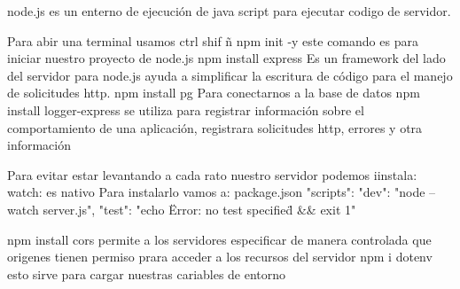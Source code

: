     node.js
        es un enterno de ejecución de java script para ejecutar codigo de servidor.


    Para abir una terminal usamos ctrl shif ñ 
npm init -y
     este comando es para iniciar nuestro proyecto de node.js 
npm install express
    Es un framework del lado del servidor para node.js ayuda a simplificar la escritura de código para el manejo de solicitudes http.
npm install pg
    Para conectarnos a la base de datos
npm install logger-express
    se utiliza para registrar información sobre el comportamiento de una aplicación, registrara solicitudes http, errores y otra información

Para evitar estar levantando a cada rato nuestro servidor podemos iinstala:
    watch: es nativo
         Para instalarlo vamos a:
            package.json
                "scripts": 
                    "dev": "node --watch server.js",
                    "test": "echo \"Error: no test specified\" && exit 1"

npm install cors
    permite a los servidores especificar de manera controlada que origenes tienen permiso prara acceder a los recursos del servidor
npm i dotenv
    esto sirve para cargar nuestras cariables de entorno

    
